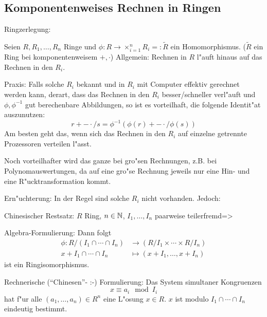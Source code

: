 \subsection{Komponentenweises Rechnen in Ringen}
\motivation Ringzerlegung:{
  Seien $R,R_1,\ldots,R_n$ Ringe und $\phi:R\to\times_{i=1}^n R_i=:\tilde R$ ein
  Homomorphismus. ($\tilde R$ ein Ring bei komponentenweisem $+,\cdot$)
  Allgemein: Rechnen in $R$ l"auft hinaus auf das Rechnen in den $R_i$.
  
  Praxis: Falls solche $R_i$ bekannt und in $R_i$ mit Computer
  effektiv gerechnet werden kann, derart, dass das Rechnen in den
  $R_i$ besser/schneller verl"auft und $\phi,\phi^{-1}$ gut berechenbare
  Abbildungen, so ist es vorteilhaft, die folgende Identit"at 
  auszunutzen:
  \[r+-\cdot/s = \phi^{-1}(\phi(r)+-\cdot / \phi(s))
    \]
  Am besten geht das,	 wenn sich das Rechnen in den $R_i$ auf einzelne
  getrennte Prozessoren verteilen l"asst.
  
  Noch vorteilhafter wird das ganze bei gro"sen Rechnungen, z.B.
  bei Polynomauswertungen, da auf eine gro"se Rechnung jeweils
  nur eine Hin- und eine R"ucktransformation kommt.
  
  Ern"uchterung: In der Regel sind solche $R_i$ nicht vorhanden. Jedoch:
  }
\theorem Chinesischer Restsatz:
  $R$ Ring, $n\in\mathbb N$, $I_1,\ldots,I_n$ paarweise teilerfremd=>{
  \label{the:crs}
  Algebra-Formulierung: Dann folgt
  \begin{align*}
    \phi: R/(I_1\cap \cdots \cap I_n) &\to (R/I_1\times \cdots\times R/I_n)\\
    x+I_1\cap \cdots \cap I_n &\mapsto (x+ I_1,\ldots, x+I_n)
    \end{align*}
  ist ein Ringisomorphismus.
  
  Rechnerische (``Chinesen''- :-) Formulierung:
  Das System simultaner Kongruenzen 
  \[ x\equiv a_i\mod I_i
    \]
  hat f"ur alle $(a_1,\ldots,a_n)\in R^n$ eine L"osung $x\in R$.
  $x$ ist modulo $I_1\cap \cdots \cap I_n$ eindeutig bestimmt.
  }
